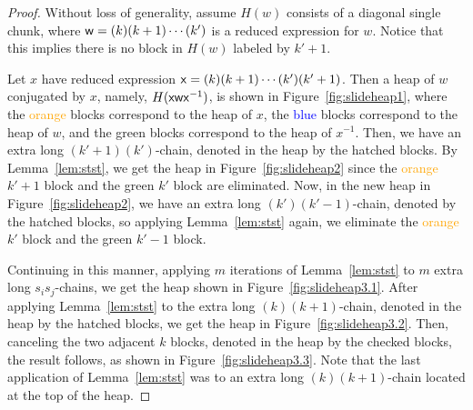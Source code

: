 \begin{proof} Without loss of generality, assume $H(w)$ consists of a diagonal single chunk, where $\mathsf{w} = (k)(k+1) \cdots (k')$ is a reduced expression for $w$.
    Notice that this implies there is no block in $H(w)$ labeled by $k'+1$.

    Let $x$ have reduced expression $\mathsf{x} = (k)(k+1) \cdots (k')(k'+1)$. Then a heap of $w$ conjugated by $x$, namely, $H({\mathsf{x}}{\mathsf{w}}{\mathsf{x}^{-1}})$, is shown in Figure~\ref{fig:slideheap1}, where the \textcolor{orange}{orange} blocks correspond to the heap of $x$, the \textcolor{blue}{blue} blocks correspond to the heap of $w$, and the \textcolor{ggreen}{green} blocks correspond to the heap of $x^{-1}$.
    Then, we have an extra long $(k'+1)(k')$-chain, denoted in the heap by the hatched blocks.
    By Lemma~\ref{lem:stst}, we get the heap in Figure~\ref{fig:slideheap2} since the \textcolor{orange}{orange} $k'+1$ block and the \textcolor{ggreen}{green} $k'$ block are eliminated.
    Now, in the new heap in Figure~\ref{fig:slideheap2}, we have an extra long $(k')(k'-1)$-chain, denoted by the hatched blocks, so applying Lemma~\ref{lem:stst} again, we eliminate the \textcolor{orange}{orange} $k'$ block and the \textcolor{ggreen}{green} $k'-1$ block.
    
    Continuing in this manner, applying $m$ iterations of Lemma~\ref{lem:stst} to $m$ extra long $s_is_j$-chains, we get the heap shown in Figure~\ref{fig:slideheap3.1}.
    After applying Lemma~\ref{lem:stst} to the extra long $(k)(k+1)$-chain, denoted in the heap by the hatched blocks, we get the heap in Figure~\ref{fig:slideheap3.2}.
    Then, canceling the two adjacent $k$ blocks, denoted in the heap by the checked blocks, the result follows, as shown in Figure~\ref{fig:slideheap3.3}.
    Note that the last application of Lemma~\ref{lem:stst} was to an extra long $(k)(k+1)$-chain located at the top of the heap.
\end{proof}

